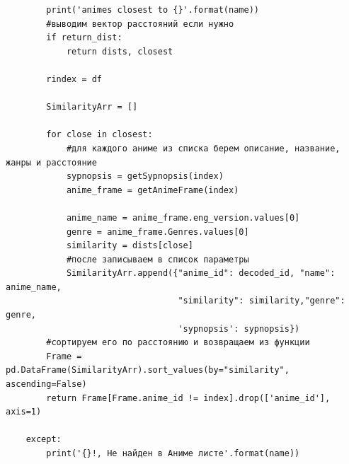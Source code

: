 \documentclass[bachelor, och, diploma]{SCWorks}
\begin{document}
\begin{verbatim}
        print('animes closest to {}'.format(name))
        #выводим вектор расстояний если нужно
        if return_dist:
            return dists, closest
        
        rindex = df

        SimilarityArr = []

        for close in closest:
            #для каждого аниме из списка берем описание, название, жанры и расстояние
            sypnopsis = getSypnopsis(index)
            anime_frame = getAnimeFrame(index)
            
            anime_name = anime_frame.eng_version.values[0]
            genre = anime_frame.Genres.values[0]
            similarity = dists[close]
            #после записываем в список параметры
            SimilarityArr.append({"anime_id": decoded_id, "name": anime_name,
                                  "similarity": similarity,"genre": genre,
                                  'sypnopsis': sypnopsis})
        #сортируем его по расстоянию и возвращаем из функции
        Frame = pd.DataFrame(SimilarityArr).sort_values(by="similarity", ascending=False)
        return Frame[Frame.anime_id != index].drop(['anime_id'], axis=1)

    except:
        print('{}!, Не найден в Аниме листе'.format(name))
\end{verbatim}
\end{document}
